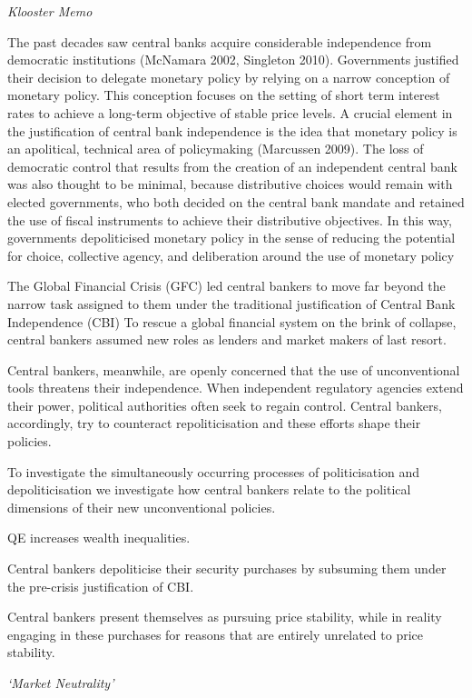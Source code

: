 \documentclass[
]{book}
\begin{document}
\emph{Klooster Memo}

The past decades saw central banks acquire considerable independence from democratic institutions
(McNamara 2002, Singleton 2010). Governments justified their decision to delegate monetary policy
by relying on a narrow conception of monetary policy. This conception focuses on the setting of short
term interest rates to achieve a long-term objective of stable price levels. A crucial element in the
justification of central bank independence is the idea that monetary policy is an apolitical, technical
area of policymaking (Marcussen 2009). The loss of democratic control that results from the creation
of an independent central bank was also thought to be minimal, because distributive choices would
remain with elected governments, who both decided on the central bank mandate and retained the
use of fiscal instruments to achieve their distributive objectives. In this way, governments depoliticised
monetary policy in the sense of reducing the potential for choice, collective agency, and deliberation
around the use of monetary policy

The Global Financial Crisis (GFC) led central bankers to move far beyond the narrow task assigned
to them under the traditional justification of Central Bank Independence (CBI)
To rescue a global financial system on the brink of collapse, central bankers assumed new roles as lenders and market makers of last resort.

Central bankers, meanwhile, are openly concerned that the use of unconventional tools threatens
their independence.
When independent regulatory agencies extend their power, political authorities often seek to regain
control.
Central bankers, accordingly, try to counteract repoliticisation and these efforts
shape their policies.

To investigate the simultaneously occurring processes of politicisation and depoliticisation
we investigate how central bankers relate to the political dimensions of their
new unconventional policies.

QE increases wealth inequalities.

Central bankers depoliticise their security purchases by subsuming
them under the pre-crisis justification of CBI.

Central bankers present themselves as pursuing price stability,
while in reality engaging in these purchases for reasons that are entirely unrelated to price stability.

\emph{`Market Neutrality'}
\end{document}
